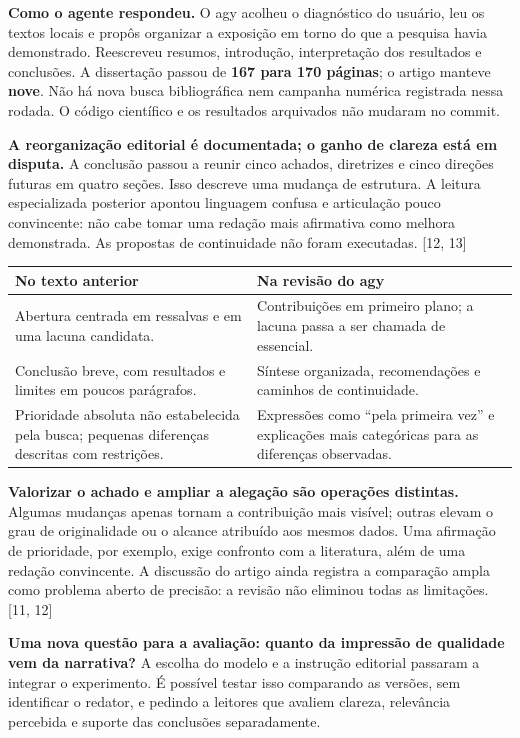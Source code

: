 \documentclass[11pt,a4paper]{article}
\newcommand{\fonte}[1]{{\small\color{navy}[#1]}}
\begin{document}
\textbf{Como o agente respondeu.} O agy acolheu o diagnóstico do usuário, leu os textos locais e propôs organizar a exposição em torno do que a pesquisa havia demonstrado. Reescreveu resumos, introdução, interpretação dos resultados e conclusões. A dissertação passou de \textbf{167 para 170 páginas}; o artigo manteve \textbf{nove}. Não há nova busca bibliográfica nem campanha numérica registrada nessa rodada. O código científico e os resultados arquivados não mudaram no commit.

\textbf{A reorganização editorial é documentada; o ganho de clareza está em disputa.} A conclusão passou a reunir cinco achados, diretrizes e cinco direções futuras em quatro seções. Isso descreve uma mudança de estrutura. A leitura especializada posterior apontou linguagem confusa e articulação pouco convincente: não cabe tomar uma redação mais afirmativa como melhora demonstrada. As propostas de continuidade não foram executadas. \fonte{12, 13}

\begin{tabularx}{\textwidth}{@{}Y Y@{}}
\toprule
\textbf{No texto anterior} & \textbf{Na revisão do agy}\\
\midrule
Abertura centrada em ressalvas e em uma lacuna candidata. & Contribuições em primeiro plano; a lacuna passa a ser chamada de essencial.\\
Conclusão breve, com resultados e limites em poucos parágrafos. & Síntese organizada, recomendações e caminhos de continuidade.\\
Prioridade absoluta não estabelecida pela busca; pequenas diferenças descritas com restrições. & Expressões como ``pela primeira vez'' e explicações mais categóricas para as diferenças observadas.\\
\bottomrule
\end{tabularx}

\textbf{Valorizar o achado e ampliar a alegação são operações distintas.} Algumas mudanças apenas tornam a contribuição mais visível; outras elevam o grau de originalidade ou o alcance atribuído aos mesmos dados. Uma afirmação de prioridade, por exemplo, exige confronto com a literatura, além de uma redação convincente. A discussão do artigo ainda registra a comparação ampla como problema aberto de precisão: a revisão não eliminou todas as limitações. \fonte{11, 12}

\begin{destaque}
\textbf{Uma nova questão para a avaliação: quanto da impressão de qualidade vem da narrativa?} A escolha do modelo e a instrução editorial passaram a integrar o experimento. É possível testar isso comparando as versões, sem identificar o redator, e pedindo a leitores que avaliem clareza, relevância percebida e suporte das conclusões separadamente.
\end{destaque}
\end{document}
